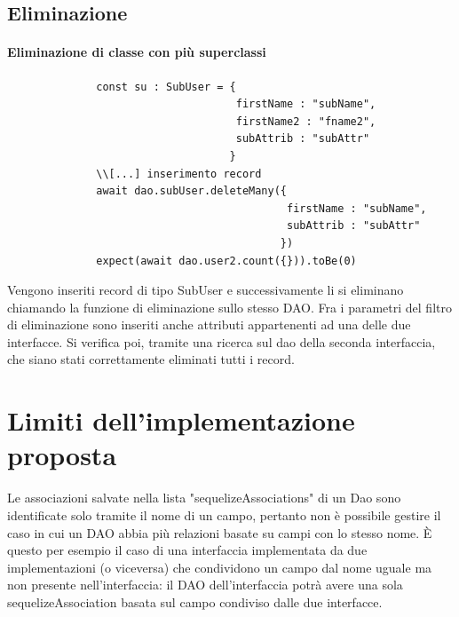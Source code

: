 \documentclass[a4paper, 12pt]{report}
\begin{document}
        \subsection{Eliminazione}
          \paragraph{Eliminazione di classe con più superclassi}
            \begin{Verbatim}
              const su : SubUser = {
                                    firstName : "subName",
                                    firstName2 : "fname2",
                                    subAttrib : "subAttr"
                                   }
              \\[...] inserimento record
              await dao.subUser.deleteMany({
                                            firstName : "subName",
                                            subAttrib : "subAttr"
                                           })
              expect(await dao.user2.count({})).toBe(0)
            \end{Verbatim}
            Vengono inseriti record di tipo SubUser e successivamente li si eliminano chiamando la funzione di eliminazione sullo stesso DAO.
            Fra i parametri del filtro di eliminazione sono inseriti anche attributi appartenenti ad una delle due interfacce.
            Si verifica poi, tramite una ricerca sul dao della seconda interfaccia, che siano stati correttamente eliminati tutti i record.
      \section{Limiti dell'implementazione proposta}
        Le associazioni salvate nella lista "sequelizeAssociations" di un Dao sono identificate solo tramite il nome di un campo, pertanto non è possibile gestire il caso in cui un DAO abbia più relazioni basate su campi con lo stesso nome.
        È questo per esempio il caso di una interfaccia implementata da due implementazioni (o viceversa) che condividono un campo dal nome uguale ma non presente nell'interfaccia: il DAO dell'interfaccia potrà avere una sola sequelizeAssociation basata sul campo condiviso dalle due interfacce.
\end{document}
